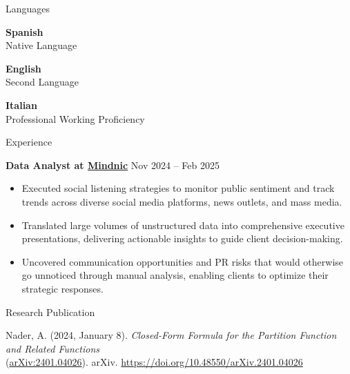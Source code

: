 \documentclass{resume} %
\begin{document}

\begin{rSection}{ Languages }

{\bf{Spanish}} \\ Native Language

{\bf{English}} \\ Second Language

{\bf{Italian}} \\ Professional Working Proficiency

\end{rSection}  


\begin{rSection}{ Experience }

{\bf Data Analyst at \href{https://mindnic.net/}{Mindnic}} \hfill {Nov 2024 -- Feb 2025}
\begin{itemize}
    \item Executed social listening strategies to monitor public sentiment and track trends across diverse social media platforms, news outlets, and mass media.
    \item Translated large volumes of unstructured data into comprehensive executive presentations, delivering actionable insights to guide client decision-making.
    \item Uncovered communication opportunities and PR risks that would otherwise go unnoticed through manual analysis, enabling clients to optimize their strategic responses.
\end{itemize}

\end{rSection}  


\begin{rSection}{ Research Publication } \itemsep -3pt

{Nader, A. (2024, January 8). \textit{Closed-Form Formula for the Partition Function and Related Functions}\\
(\href{https://doi.org/10.48550/arXiv.2401.04026}{arXiv:2401.04026}). arXiv. \href{https://doi.org/10.48550/arXiv.2401.04026}{https://doi.org/10.48550/arXiv.2401.04026}}
 
\end{rSection}
\end{document}
